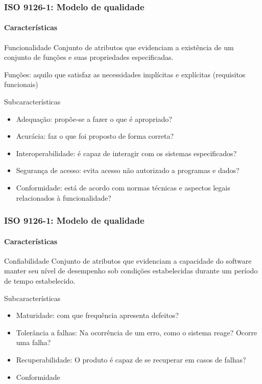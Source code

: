 \begin{frame}
	\frametitle{ISO 9126-1: Modelo de qualidade}
	\framesubtitle{Características}
	
	\begin{block:fact}{Funcionalidade}
		Conjunto de atributos que evidenciam a existência de um conjunto de funções
		e suas propriedades especificadas.

		Funções: aquilo que satisfaz as necessidades implícitas e explícitas
		(requisitos funcionais)
	\end{block:fact}
	
	\begin{block:fact}{Subcaracterísticas}
		\begin{itemize}
			\item Adequação: propõe-se a fazer o que é apropriado?
			\item Acurácia: faz o que foi proposto de forma correta?
			\item Interoperabilidade: é capaz de interagir com os sistemas especificados?
			\item Segurança de acesso: evita acesso não autorizado a programas e dados?
			\item Conformidade: está de acordo com normas técnicas e aspectos legais
			relacionados à funcionalidade?
		\end{itemize}
	\end{block:fact}
\end{frame}



\begin{frame}
	\frametitle{ISO 9126-1: Modelo de qualidade}
	\framesubtitle{Características}
	
	\begin{block:fact}{Confiabilidade}
		Conjunto de atributos que evidenciam a capacidade do software manter seu nível
		de desempenho sob condições estabelecidas durante um período de tempo
		estabelecido.
	\end{block:fact}
	
	\begin{block:fact}{Subcaracterísticas}
		\begin{itemize}
			\item Maturidade: com que frequência apresenta defeitos?
			\item Tolerância a falhas: Na ocorrência de um erro, como o sistema
			reage? Ocorre uma falha?
			\item Recuperabilidade: O produto é capaz de se recuperar em casos de
			falhas?
			\item Conformidade
		\end{itemize}
	\end{block:fact}
\end{frame}




